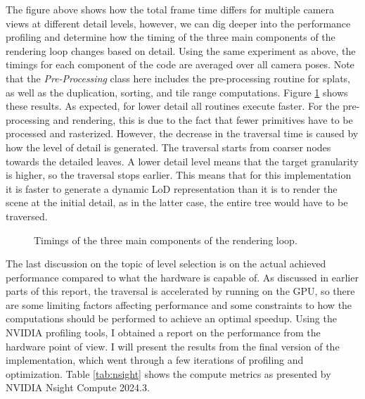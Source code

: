 The figure above shows how the total frame time differs for multiple camera views at different detail levels, however, we can dig deeper into the performance profiling and determine how the timing of the three main components of the rendering loop changes based on detail. Using the same experiment as above, the timings for each component of the code are averaged over all camera poses. Note that the \textit{Pre-Processing} class here includes the pre-processing routine for splats, as well as the duplication, sorting, and tile range computations. Figure \ref{fig:variation} shows these results. As expected, for lower detail all routines execute faster. For the pre-processing and rendering, this is due to the fact that fewer primitives have to be processed and rasterized. However, the decrease in the traversal time is caused by how the level of detail is generated. The traversal starts from coarser nodes towards the detailed leaves. A lower detail level means that the target granularity is higher, so the traversal stops earlier. This means that for this implementation it is faster to generate a dynamic LoD representation than it is to render the scene at the initial detail, as in the latter case, the entire tree would have to be traversed.

\begin{figure}[H]
    \centering
    
    \caption{Timings of the three main components of the rendering loop.}
    \label{fig:variation}
\end{figure}

The last discussion on the topic of level selection is on the actual achieved performance compared to what the hardware is capable of. As discussed in earlier parts of this report, the traversal is accelerated by running on the GPU, so there are some limiting factors affecting performance and some constraints to how the computations should be performed to achieve an optimal speedup. Using the NVIDIA profiling tools, I obtained a report on the performance from the hardware point of view. I will present the results from the final version of the implementation, which went through a few iterations of profiling and optimization. Table \ref{tab:nsight} shows the compute metrics as presented by NVIDIA Nsight Compute 2024.3. 

